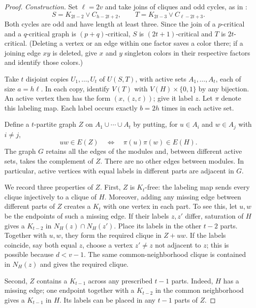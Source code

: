 \documentclass[11pt]{article}
\numberwithin{equation}{section}
\begin{document}
\begin{proof}
\emph{Construction.}
Set \(\ell=2v\) and take joins of cliques and odd cycles, as in
\cite[p.~90]{Dirac1952}:
\[
 S=K_{2t-2}\vee C_{h-2t+2},\qquad
 T=K_{2t-3}\vee C_{\ell-2t+3}.
\]
Both cycles are odd and have length at least three. Since the join of
a \(p\)-critical and a \(q\)-critical graph is \((p+q)\)-critical,
\(S\) is \((2t+1)\)-critical and \(T\) is \(2t\)-critical.
(Deleting a vertex or an edge within one factor saves a color there;
if a joining edge \(xy\) is deleted, give \(x\) and \(y\) singleton
colors in their respective factors and identify those colors.)

Take \(t\) disjoint copies \(U_1,\ldots,U_t\) of \(U(S,T)\),
with active sets \(A_1,\ldots,A_t\), each of size \(a=h\ell\).
In each copy, identify \(V(T)\) with \(V(H)\times\{0,1\}\)
by any bijection. An active vertex then has the form
\((x,(z,\varepsilon))\); give it label \(z\).
Let \(\pi\) denote this labeling map. Each label occurs
exactly \(b=2h\) times in each active set.

Define a \(t\)-partite graph \(Z\) on \(A_1\cup\cdots\cup A_t\)
by putting, for \(u\in A_i\) and \(w\in A_j\) with \(i\ne j\),
\[
 uw\in E(Z)\quad\Longleftrightarrow\quad
 \pi(u)\pi(w)\in E(H).
\]
The graph \(G\) retains all the edges of the modules and,
between different active sets, takes the complement of \(Z\).
There are no other edges between modules. In particular, active
vertices with equal labels in different parts are adjacent in \(G\).

We record three properties of \(Z\). First, \(Z\) is
\(K_t\)-free: the labeling map sends every clique injectively
to a clique of \(H\). Moreover, adding any missing edge between
different parts of \(Z\) creates a \(K_t\) with one vertex in
each part. To see this, let \(u,w\) be the endpoints of such a
missing edge. If their labels \(z,z'\) differ, saturation of
\(H\) gives a \(K_{t-2}\) in \(N_H(z)\cap N_H(z')\).
Place its labels in the other \(t-2\) parts. Together with
\(u,w\), they form the required clique in \(Z+uw\).
If the labels coincide, say both equal \(z\), choose a vertex
\(z'\ne z\) not adjacent to \(z\); this is possible because
\(d<v-1\). The same common-neighborhood clique is contained
in \(N_H(z)\) and gives the required clique.

Second, \(Z\) contains a \(K_{t-1}\) across any prescribed
\(t-1\) parts. Indeed, \(H\) has a missing edge; one endpoint
together with a \(K_{t-2}\) in the common neighborhood gives
a \(K_{t-1}\) in \(H\). Its labels can be placed in any
\(t-1\) parts of \(Z\).


\end{proof}
\end{document}
